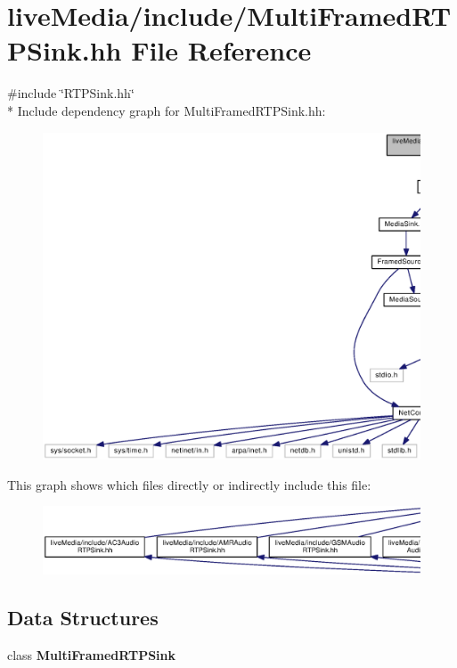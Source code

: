 \section{live\+Media/include/\+Multi\+Framed\+R\+T\+P\+Sink.hh File Reference}
\label{MultiFramedRTPSink_8hh}
{\ttfamily \#include \char`\"{}R\+T\+P\+Sink.\+hh\char`\"{}}\\*
Include dependency graph for Multi\+Framed\+R\+T\+P\+Sink.\+hh\+:
\nopagebreak
\begin{figure}[H]
\begin{center}
\leavevmode
\includegraphics[width=350pt]{MultiFramedRTPSink_8hh__incl}
\end{center}
\end{figure}
This graph shows which files directly or indirectly include this file\+:
\nopagebreak
\begin{figure}[H]
\begin{center}
\leavevmode
\includegraphics[width=350pt]{MultiFramedRTPSink_8hh__dep__incl}
\end{center}
\end{figure}
\subsection*{Data Structures}
\begin{DoxyCompactItemize}
\item 
class {\bf Multi\+Framed\+R\+T\+P\+Sink}
\end{DoxyCompactItemize}
